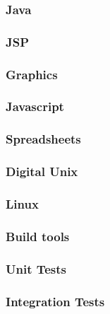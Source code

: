 \documentclass[letterpaper,10pt,english]{sphinxmanual}
\begin{document}
\subsubsection{Java}
\label{\detokenize{Contributions:id13}}

\subsubsection{JSP}
\label{\detokenize{Contributions:id14}}

\subsubsection{Graphics}
\label{\detokenize{Contributions:id15}}

\subsubsection{Javascript}
\label{\detokenize{Contributions:id16}}

\subsubsection{Spreadsheets}
\label{\detokenize{Contributions:id17}}

\subsubsection{Digital Unix}
\label{\detokenize{Contributions:id18}}

\subsubsection{Linux}
\label{\detokenize{Contributions:id19}}

\subsubsection{Build tools}
\label{\detokenize{Contributions:id20}}

\subsubsection{Unit Tests}
\label{\detokenize{Contributions:id21}}

\subsubsection{Integration Tests}
\label{\detokenize{Contributions:id22}}
\end{document}
